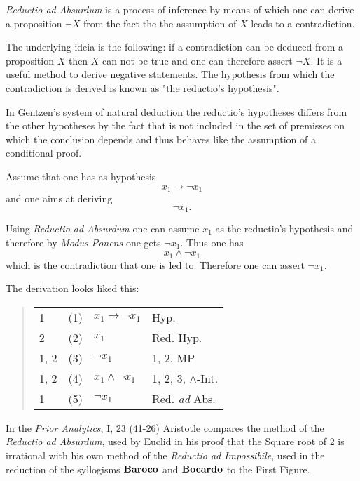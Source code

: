 \documentclass[12pt]{article}
\begin{document}
\emph{Reductio ad Absurdum} is a process of inference by means of which one can derive a proposition $\neg X$ from the fact the the assumption of $X$ leads to a contradiction.

The underlying ideia is the following: if a contradiction can be deduced from a proposition $X$ then $X$ can not be true and one can therefore assert $\neg X$. It is a useful method to derive negative statements. The hypothesis from which the contradiction is derived is known as "the reductio's hypothesis".

In Gentzen's system of natural deduction the reductio's hypotheses differs from the other hypotheses by the fact that is not included in the set of premisses on which the conclusion depends and thus behaves like the assumption of a conditional proof.

Assume that one has as hypothesis
\[x_1 \to \neg x_1 \]
and one aims at deriving
\[\neg x_1. \]

Using \emph{Reductio ad Absurdum} one can assume $x_1$ as the reductio's hypothesis and therefore by \emph{Modus Ponens} one gets $\neg x_1$. Thus one has
\[x_1 \wedge \neg x_1 \]
which is the contradiction that one is led to. Therefore one can assert $\neg x_1$.

\vspace{3mm}

The derivation looks liked this:

\vspace{4mm}

\begin{quote}
\begin{tabular}{llll}
1&(1)&$x_1 \to \neg x_1$&Hyp.\\
2&(2)&$x_1$&Red. Hyp.\\
1, 2&(3)&$\neg x_1$&1, 2, MP\\
1, 2&(4)&$x_1 \land \neg x_1$&1, 2, 3, $\land$-Int.\\
1&(5)&$\neg x_1$&Red. \emph{ad} Abs.
\end{tabular}
\end{quote}

\vspace{4mm}

In the \emph{Prior Analytics}, I, 23 (41-26) Aristotle compares the method of the \emph{Reductio ad Absurdum}, used by Euclid in his proof that the Square root of 2 is irrational with his own method of the \emph{Reductio ad Impossibile}, used in the reduction of the syllogisms $\bf Baroco$ and $\bf Bocardo$ to the First Figure.
\end{document}
